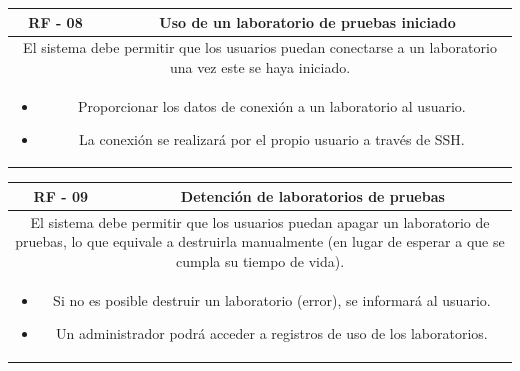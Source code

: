                \begin{table}[!htbp]
                    \centering

                    \begin{tabular}{|c|c|}
                        \hline
                        \textbf{RF - 08} & \textbf{Uso de un laboratorio de pruebas iniciado} \\
                        \hline
                        \multicolumn{2}{|p{15cm}|}{
                            El sistema debe permitir que los usuarios puedan conectarse a un laboratorio una vez este se haya iniciado.
                        } \\
                        \hline
                        \multicolumn{2}{|p{15cm}|}{
                            \begin{itemize}
                                \item Proporcionar los datos de conexión a un laboratorio al usuario.
                                \item La conexión se realizará por el propio usuario a través de SSH.
                            \end{itemize}
                            } \\
                        \hline
                    \end{tabular}

                    \label{tab:RF08}
                \end{table}
                
                \begin{table}[!htbp]
                    \centering

                    \begin{tabular}{|c|c|}
                        \hline
                        \textbf{RF - 09} & \textbf{Detención de laboratorios de pruebas} \\
                        \hline
                        \multicolumn{2}{|p{15cm}|}{
                            El sistema debe permitir que los usuarios puedan apagar un laboratorio de pruebas, lo que equivale a destruirla manualmente (en lugar de esperar a que se cumpla su tiempo de vida).
                        } \\
                        \hline
                        \multicolumn{2}{|p{15cm}|}{
                            \begin{itemize}
                                \item Si no es posible destruir un laboratorio (error), se informará al usuario.
                                \item Un administrador podrá acceder a registros de uso de los laboratorios.
                            \end{itemize}
                            } \\
                        \hline
                    \end{tabular}

                    \label{tab:RF09}
                \end{table}
                
